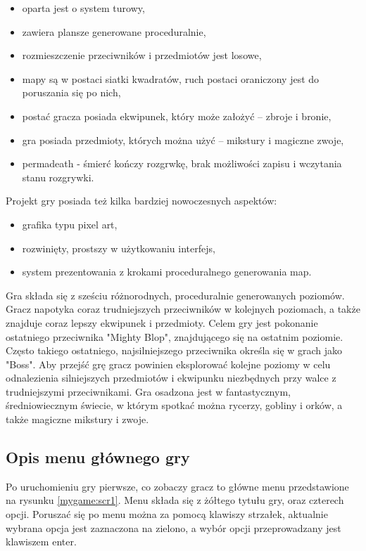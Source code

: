 \documentclass[12pt,twoside]{article}
\begin{document}
\begin{itemize}
	\item oparta jest o system turowy,
	\item zawiera plansze generowane proceduralnie,
	\item rozmieszczenie przeciwników i przedmiotów jest losowe,
	\item mapy są w postaci siatki kwadratów, ruch postaci oraniczony jest do poruszania się po nich,
	\item postać gracza posiada ekwipunek, który może założyć -- zbroje i bronie,
	\item gra posiada przedmioty, których można użyć -- mikstury i magiczne zwoje,
	\item permadeath - śmierć kończy rozgrwkę, brak możliwości zapisu i wczytania stanu rozgrywki.		
\end{itemize}

Projekt gry posiada też kilka bardziej nowoczesnych aspektów:
\begin{itemize}
	\item grafika typu pixel art,
	\item rozwinięty, prostszy w użytkowaniu interfejs,			
	\item system prezentowania z krokami proceduralnego generowania map.
\end{itemize}

Gra składa się z sześciu różnorodnych, proceduralnie generowanych poziomów. Gracz napotyka coraz trudniejszych przeciwników w kolejnych poziomach, a także znajduje coraz lepszy ekwipunek i przedmioty. Celem gry jest pokonanie ostatniego przeciwnika "Mighty Blop", znajdującego się na ostatnim poziomie. Często takiego ostatniego, najsilniejszego przeciwnika określa się w grach jako "Boss". Aby przejść grę gracz powinien eksplorować kolejne poziomy w celu odnalezienia silniejszych przedmiotów i ekwipunku  niezbędnych przy walce z trudniejszymi przeciwnikami.  Gra osadzona jest w fantastycznym, średniowiecznym świecie, w którym spotkać można rycerzy, gobliny i orków, a także magiczne mikstury i zwoje.


\subsection{Opis menu głównego gry}
Po uruchomieniu gry pierwsze, co zobaczy gracz to główne menu przedstawione na rysunku \ref{mygame:scr1}. Menu składa się z żółtego tytułu gry, oraz czterech opcji. Poruszać się po menu można za pomocą klawiszy strzałek, aktualnie wybrana opcja jest zaznaczona na zielono, a wybór opcji przeprowadzany jest klawiszem enter.
\end{document}
